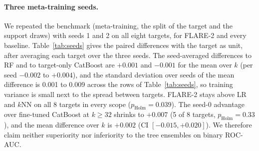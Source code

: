 \documentclass[pdflatex,sn-mathphys-num]{sn-jnl}%
\begin{document}
\paragraph{Three meta-training seeds.}
We repeated the benchmark (meta-training, the split of the target and the support draws) with seeds 1 and 2 on all eight targets, for FLARE-2 and every baseline.
Table~\ref{tab:seeds} gives the paired differences with the target as unit, after averaging each target over the three seeds.
The seed-averaged differences to RF and to target-only CatBoost are $+0.001$ and $-0.001$ for the mean over $k$ (per seed $-0.002$ to $+0.004$), and the standard deviation over seeds of the mean difference is 0.001 to 0.009 across the rows of Table~\ref{tab:seeds}, so training variance is small next to the spread between targets.
FLARE-2 stays above LR and $k$NN on all 8 targets in every scope ($p_{\text{Holm}}=0.039$).
The seed-0 advantage over fine-tuned CatBoost at $k\ge 32$ shrinks to $+0.007$ (5 of 8 targets, $p_{\text{Holm}}=0.33$), and the mean difference over $k$ is $+0.002$ (CI $[-0.015,+0.020]$).
We therefore claim neither superiority nor inferiority to the tree ensembles on binary ROC-AUC.
\end{document}
